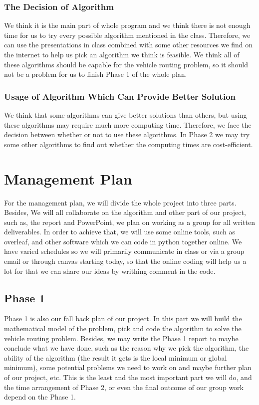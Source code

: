 \documentclass[11pt]{article}
\begin{document}
\subsubsection{The Decision of Algorithm}
We think it is the main part of whole program and we think there is not enough time for us to try every possible algorithm mentioned in the class. Therefore, we can use the presentations in class combined with some other resources we find on the internet to help us pick an algorithm we think is feasible. We think all of these algorithms should be capable for the vehicle routing problem, so it should not be a problem for us to finish Phase 1 of the whole plan.

\subsubsection{Usage of Algorithm Which Can Provide Better Solution}
We think that some algorithms can give better solutions than others, but using these algorithms may require much more computing time. Therefore, we face the decision between whether or not to use these algorithms. In Phase 2 we may try some other algorithms to find out whether the computing times are cost-efficient. 

\section{Management Plan}
For the management plan, we will divide the whole project into three parts. Besides, We will all collaborate on the algorithm and other part of our project, such as, the report and PowerPoint, we plan on working as a group for all written deliverables. In order to achieve that, we will use some online tools, such as overleaf, and other software which we can code in python together online. We have varied schedules so we will primarily communicate in class or via a group email or through canvas starting today, so that the online coding will help us a lot for that we can share our ideas by writhing comment in the code. 

\subsection{Phase 1}
Phase 1 is also our fall back plan of our project. In this part we will build the mathematical model of the problem, pick and code the algorithm to solve the vehicle routing problem. Besides, we may write the Phase 1 report to maybe conclude what we have done, such as the reason why we pick the algorithm, the ability of the algorithm (the result it gets is the local minimum or global minimum), some potential problems we need to work on and maybe further plan of our project, etc. This is the least and the most important part we will do, and the time arrangement of Phase 2, or even the final outcome of our group work depend on the Phase 1.
\end{document}
